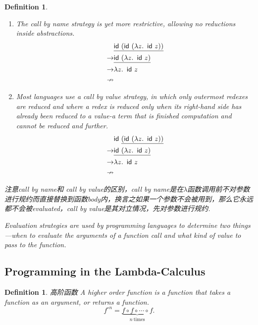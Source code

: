 \documentclass{article}
\theoremstyle{plain}
\newtheorem{definition}[theorem]{Definition}
\theoremstyle{nonumberplain}
\newcommand{\lam}[2]{\ensuremath{\lambda #1\ldotp~ #2}} %
\newcommand{\term}[1]{\ensuremath\mathsf{#1}}
\begin{document}
\begin{definition}
\begin{enumerate}
$$\begin{aligned}
	\rightarrow & \lam{z}{z} \\
	\nrightarrow
	\end{aligned}
	$$
	\item The {\color{red} call by name} strategy is yet more restrictive, allowing no reductions inside abstractions. 
	$$
	\begin{aligned}
	& \underline{\term{id}~(\term{id}~(\lam{z}{\term{id}~z}))} \\
	\rightarrow & \underline{\term{id}~(\lam{z}{\term{id}}~z)} \\
	\rightarrow & \lam{z}{\term{id}~z} \\
	\nrightarrow
	\end{aligned}
	$$
	\item Most languages use a {\color{red} call by value} strategy, in which only outermost redexes are reduced and where a redex is reduced only when its right-hand side has already been reduced to a value-a term that is finished computation and cannot be reduced and further.
	$$
	\begin{aligned}
	& \term{id}~\underline{(\term{id}~(\lam{z}{\term{id}~z}))} \\
	\rightarrow & \underline{\term{id}~(\lam{z}{\term{id}}~z)} \\
	\rightarrow & \lam{z}{\term{id}~z} \\
	\nrightarrow
	\end{aligned}
	$$
\end{enumerate}

{\color{blue} 注意call by name和 call by value的区别，call by name是在$\lambda$函数调用前不对参数进行规约而直接替换到函数body内，换言之如果一个参数不会被用到，那么它永远都不会被evaluated，call by value是其对立情况，先对参数进行规约}.

{\color{red} Evaluation strategies are used by programming languages to determine two things—when to evaluate the arguments of a function call and what kind of value to pass to the function}.
\end{definition}

\newpage
\subsection{Programming in the Lambda-Calculus}

\begin{definition}
\rm {\color{red} 高阶函数} A higher order function is a function that takes a function as an argument, or returns a function.
$$
f^{\circ n} = \underbrace{f \circ f \circ \cdots \circ f}_{n~\text{times}}.
$$
\end{definition}
\end{document}

